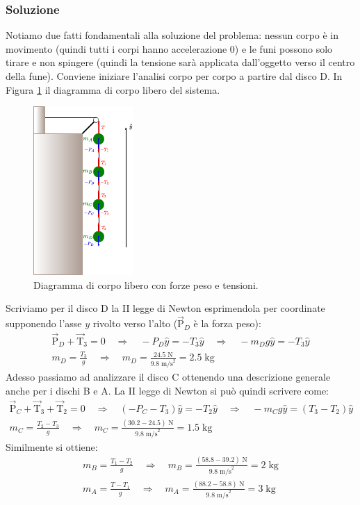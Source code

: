 \documentclass[12pt,a4paper]{book}
\begin{document}
\subsubsection*{Soluzione}
Notiamo due fatti fondamentali alla soluzione del problema: nessun corpo è in movimento (quindi tutti i corpi hanno accelerazione 0) e le funi possono solo tirare e non spingere (quindi la tensione sarà applicata dall'oggetto verso il centro della fune). Conviene iniziare l'analisi corpo per corpo a partire dal disco D. In Figura  \ref{fig:4-p-3-2} il diagramma di corpo libero del sistema. 

\begin{figure}[!ht]
\centering
\includegraphics[scale=3]{p-3-2.pdf}
\caption{Diagramma di corpo libero con forze peso e tensioni.} 
\label{fig:4-p-3-2} 
\end{figure}

Scriviamo per il disco D la II legge di Newton esprimendola per coordinate supponendo l'asse $y$ rivolto verso l'alto ($\vec{\text{P}}_D$ è la forza peso):
%
\begin{gather*}
\vec{\text{P}}_D+\vec{\text{T}}_3=0 \quad \Longrightarrow \quad -P_D\hat{y}=-T_3\hat{y} \quad \Longrightarrow \quad -m_Dg\hat{y}=-T_3\hat{y}\\
m_D=\frac{T_3}{g} \quad \Longrightarrow \quad m_D=\frac{24.5\;\text{N}}{9.8\;\text{m/s}^2}=2.5\;\text{kg}
\end{gather*}
%
Adesso passiamo ad analizzare il disco C ottenendo una descrizione generale anche per i dischi B e A. La II legge di Newton si può quindi scrivere come:
%
\begin{gather*}
\vec{\text{P}}_C+\vec{\text{T}}_3+\vec{\text{T}}_2=0 \quad \Longrightarrow \quad (-P_C-T_3)\hat{y}=-T_2\hat{y} \quad \Longrightarrow \quad -m_Cg\hat{y}=(T_3-T_2)\hat{y}\\
m_C=\frac{T_2-T_3}{g} \quad \Longrightarrow \quad m_C=\frac{(30.2-24.5)\;\text{N}}{9.8\;\text{m/s}^2}=1.5\;\text{kg}
\end{gather*}
%
Similmente si ottiene:
%
\begin{gather*}
m_B=\frac{T_1-T_2}{g} \quad \Longrightarrow \quad m_B=\frac{(58.8-39.2)\;\text{N}}{9.8\;\text{m/s}^2}=2\;\text{kg} \\
m_A=\frac{T-T_1}{g} \quad \Longrightarrow \quad m_A=\frac{(88.2-58.8)\;\text{N}}{9.8\;\text{m/s}^2}=3\;\text{kg}
\end{gather*}
%
\end{document}
